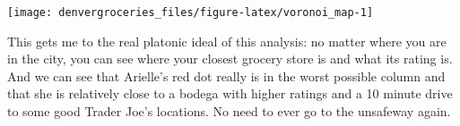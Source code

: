 \documentclass[]{tufte-handout}
\begin{document}
\texttt{[image: denvergroceries\_files/figure-latex/voronoi\_map-1]}

This gets me to the real platonic ideal of this analysis: no matter
where you are in the city, you can see where your closest grocery store
is and what its rating is. And we can see that Arielle's red dot really
is in the worst possible column and that she is relatively close to a
bodega with higher ratings and a 10 minute drive to some good Trader
Joe's locations. No need to ever go to the unsafeway again.
\end{document}
